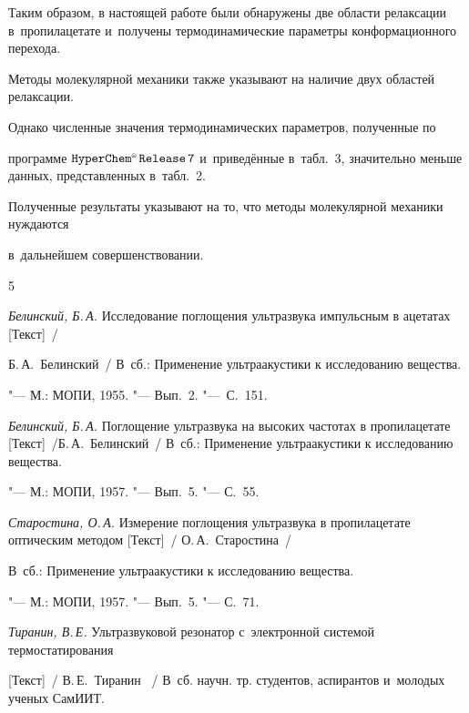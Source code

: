 Таким образом, в настоящей работе были обнаружены две области релаксации в~пропилацетате и~получены термодинамические параметры конформационного перехода. 

Методы молекулярной механики также указывают на наличие двух областей релаксации. 

Однако численные значения термодинамических параметров, полученные по 

программе $\tt  HyperChem^{\text{\tiny \textregistered}}\, Release\, 7$ и~приведённые в~табл.~3, значительно меньше данных, представленных в~табл.~2. 

Полученные результаты указывают на то, что методы молекулярной механики нуждаются 

в~дальнейшем совершенствовании. 



\begin{thebibliography}{5}

\item

\textit{Белинский, Б.\,А.} Исследование поглощения ультразвука импульсным в ацетатах [Текст]~/

Б.\,А.~Белинский~/ В~сб.: Применение ультраакустики к исследованию вещества.

"--- М.: МОПИ, 1955. "--- Вып.~2. "---~С.~151.



\item

\textit{Белинский, Б.\,А.} Поглощение ультразвука на высоких частотах в пропилацетате [Текст]~/Б.\,А.~Белинский~/ В~сб.: Применение ультраакустики к исследованию вещества.

"--- М.: МОПИ,  1957. "--- Вып.~5. "--- С.~55.



\item

\textit{Старостина, О.\,А.} Измерение поглощения ультразвука в пропилацетате оптическим методом [Текст]~/ О.\,А.~Старостина~/ 

В~сб.: Применение ультраакустики к исследованию вещества.

"--- М.: МОПИ,  1957. "--- Вып.~5. "--- С.~71.



\item

\textit{Тиранин, В.\,Е.} Ультразвуковой резонатор с~электронной системой термостатирования 

[Текст]~/ В.\,Е.~Тиранин~ / В~сб. научн. тр. студентов, аспирантов и~молодых ученых СамИИТ.


\end{thebibliography}
